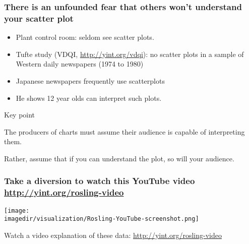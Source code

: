 \begin{frame}\frametitle{There is an unfounded fear that others won't understand your scatter plot}
	
	\begin{itemize}
		\item	Plant control room: seldom see scatter plots. 

		\item	Tufte study (VDQI, \href{http://yint.org/vdqi}{http://yint.org/vdqi}): no scatter plots in a sample of Western daily newspapers (1974 to 1980)
		\item	Japanese newspapers frequently use scatterplots 
		\item	He shows 12 year olds can interpret such plots. 
	\end{itemize}
	
	\pause
	\begin{block}
		{Key point} 
		\begin{center}
			The producers of charts must assume their audience is capable of interpreting them. 
			
			\vspace{12pt}
			{\color{red}Rather, assume that if you can understand the plot, so will your audience. }
		\end{center}
	\end{block}
\end{frame}

\begin{frame}\frametitle{Take a diversion to watch this YouTube video \href{http://www.youtube.com/v/jbkSRLYSojo}{http://yint.org/rosling-video}}
	\vspace{2pt}
	\centerline{\texttt{[image: \\imagedir/visualization/Rosling-YouTube-screenshot.png]}}
	
	Watch a video explanation of these data: \href{http://www.youtube.com/v/jbkSRLYSojo}{http://yint.org/rosling-video} 
\end{frame}

